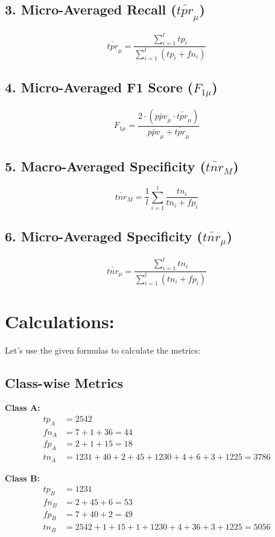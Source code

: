 \documentclass{article}
\begin{document}
\subsection*{3. Micro-Averaged Recall (\( \bar{tpr}_\mu \))}
\[
\bar{tpr}_\mu = \frac{\sum_{i=1}^{l} tp_i}{\sum_{i=1}^{l} (tp_i + fn_i)}
\]

\subsection*{4. Micro-Averaged F1 Score (\( F_{1\mu} \))}
\[
F_{1\mu} = \frac{2 \cdot (\bar{ppv}_\mu \cdot \bar{tpr}_\mu)}{\bar{ppv}_\mu + \bar{tpr}_\mu}
\]

\subsection*{5. Macro-Averaged Specificity (\( \bar{tnr}_M \))}
\[
\bar{tnr}_M = \frac{1}{l} \sum_{i=1}^{l} \frac{tn_i}{tn_i + fp_i}
\]

\subsection*{6. Micro-Averaged Specificity (\( \bar{tnr}_\mu \))}
\[
\bar{tnr}_\mu = \frac{\sum_{i=1}^{l} tn_i}{\sum_{i=1}^{l} (tn_i + fp_i)}
\]

\section*{Calculations:}
Let's use the given formulas to calculate the metrics:

\subsection*{Class-wise Metrics}
\textbf{Class A:}
\begin{align*}
tp_A &= 2542 \\
fn_A &= 7 + 1 + 36 = 44 \\
fp_A &= 2 + 1 + 15 = 18 \\
tn_A &= 1231 + 40 + 2 + 45 + 1230 + 4 + 6 + 3 + 1225 = 3786
\end{align*}

\textbf{Class B:}
\begin{align*}
tp_B &= 1231 \\
fn_B &= 2 + 45 + 6 = 53 \\
fp_B &= 7 + 40 + 2 = 49 \\
tn_B &= 2542 + 1 + 15 + 1 + 1230 + 4 + 36 + 3 + 1225 = 5056
\end{align*}
\end{document}
